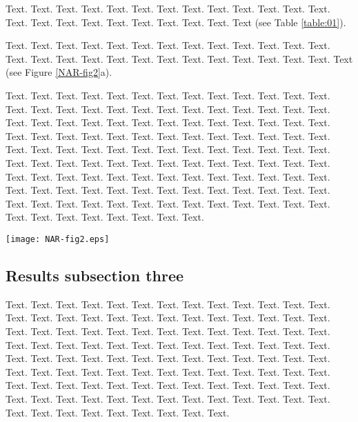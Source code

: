 \documentclass[a4,center,fleqn]{NAR}
\begin{document}
Text.  Text. Text. Text. Text. Text. Text. Text. Text. Text. Text.
Text. Text. Text. Text. Text. Text. Text. Text. Text. Text. Text.
Text (see Table \ref{table:01}).

Text. Text. Text. Text. Text. Text.
Text. Text. Text. Text. Text. Text. Text. Text. Text. Text. Text.
Text. Text. Text. Text. Text. Text. Text. Text. Text.
Text (see Figure \ref{NAR-fig2}a).

Text. Text. Text. Text. Text.
Text. Text. Text. Text. Text. Text. Text. Text. Text. Text. Text.
Text. Text. Text. Text. Text. Text. Text. Text. Text. Text. Text.
Text. Text. Text. Text. Text. Text. Text. Text. Text. Text. Text.
Text. Text. Text. Text. Text. Text. Text. Text. Text. Text. Text.
Text. Text. Text. Text. Text. Text. Text. Text. Text. Text. Text.
Text. Text. Text. Text. Text. Text. Text. Text. Text. Text. Text.
Text. Text. Text. Text. Text. Text. Text. Text. Text. Text. Text.
Text. Text. Text. Text. Text. Text. Text. Text. Text. Text. Text.
Text. Text. Text. Text. Text. Text. Text. Text. Text. Text. Text.
Text. Text. Text. Text. Text. Text. Text. Text. Text. Text. Text.
Text. Text. Text. Text. Text. Text. Text. Text. Text. Text.

\begin{figure*}[t]
\begin{center}
\texttt{[image: NAR-fig2.eps]}
\end{center}
\caption{Caption for wide figure over two columns.
\textbf{(a)} Left figure.
\textbf{(b)} Right figure (see (a)).
}
\label{NAR-fig2}
\end{figure*}


\subsection{Results subsection three}

Text. Text. Text. Text. Text. Text. Text. Text. Text. Text. Text.
Text. Text. Text. Text. Text. Text. Text. Text. Text. Text. Text.
Text. Text. Text. Text. Text. Text. Text. Text. Text. Text. Text.
Text. Text. Text. Text. Text. Text. Text. Text. Text. Text. Text.
Text. Text. Text. Text. Text. Text. Text. Text. Text. Text. Text.
Text. Text. Text. Text. Text. Text. Text. Text. Text. Text. Text.
Text. Text. Text. Text. Text. Text. Text. Text. Text. Text. Text.
Text. Text. Text. Text. Text. Text. Text. Text. Text. Text. Text.
Text. Text. Text. Text. Text. Text. Text. Text. Text. Text. Text.
Text. Text. Text. Text. Text. Text. Text. Text. Text. Text. Text.
Text. Text. Text.
\end{document}
